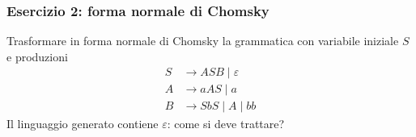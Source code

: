 \begin{frame}[fragile]
        \frametitle{Esercizio 2: forma normale di Chomsky}
Trasformare in forma normale di Chomsky la grammatica con variabile iniziale $S$ e produzioni
\begin{align*}
S & \to ASB \mid \varepsilon\\
A & \to aAS \mid a\\
B & \to SbS \mid A \mid bb
\end{align*}
Il linguaggio generato contiene $\varepsilon$: come si deve trattare?
\end{frame}


